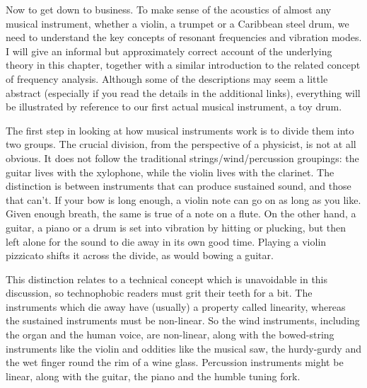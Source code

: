   Now to get down to business. To make sense of the acoustics of almost any 
  musical instrument, whether a violin, a trumpet or a Caribbean steel drum, we 
  need to understand the key concepts of resonant frequencies and vibration 
  modes. I will give an informal but approximately correct account of the 
  underlying theory in this chapter, together with a similar introduction to 
  the related concept of frequency analysis. Although some of the descriptions 
  may seem a little abstract (especially if you read the details in the 
  additional links), everything will be illustrated by reference to our first 
  actual musical instrument, a toy drum. 

  The first step in looking at how musical instruments work is to divide them 
  into two groups. The crucial division, from the perspective of a physicist, 
  is not at all obvious. It does not follow the traditional 
  strings/wind/percussion groupings: the guitar lives with the xylophone, while 
  the violin lives with the clarinet. The distinction is between instruments 
  that can produce sustained sound, and those that can't. If your bow is long 
  enough, a violin note can go on as long as you like. Given enough breath, the 
  same is true of a note on a flute. On the other hand, a guitar, a piano or a 
  drum is set into vibration by hitting or plucking, but then left alone for 
  the sound to die away in its own good time. Playing a violin pizzicato shifts 
  it across the divide, as would bowing a guitar. 

  This distinction relates to a technical concept which is unavoidable in this 
  discussion, so technophobic readers must grit their teeth for a bit. The 
  instruments which die away have (usually) a property called linearity, 
  whereas the sustained instruments must be non-linear. So the wind 
  instruments, including the organ and the human voice, are non-linear, along 
  with the bowed-string instruments like the violin and oddities like the 
  musical saw, the hurdy-gurdy and the wet finger round the rim of a wine 
  glass. Percussion instruments might be linear, along with the guitar, the 
  piano and the humble tuning fork. 

